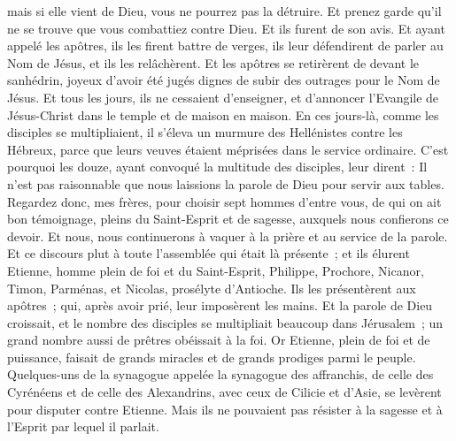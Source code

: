 \begin{multicols}{2}
mais si elle vient de Dieu, vous ne pourrez pas la détruire. Et prenez garde qu'il ne se trouve que vous combattiez contre Dieu.
Et ils furent de son avis. Et ayant appelé les apôtres, ils les firent battre de verges, ils leur défendirent de parler au Nom de Jésus, et ils les relâchèrent.
Et les apôtres se retirèrent de devant le sanhédrin, joyeux d'avoir été jugés dignes de subir des outrages pour le Nom de Jésus.
Et tous les jours, ils ne cessaient d'enseigner, et d'annoncer l'Evangile de Jésus-Christ dans le temple et de maison en maison.
\VerseOne{}En ces jours-là, comme les disciples se multipliaient, il s'éleva un murmure des Hellénistes contre les Hébreux, parce que leurs veuves étaient méprisées dans le service ordinaire.
C'est pourquoi les douze, ayant convoqué la multitude des disciples, leur dirent~: Il n'est pas raisonnable que nous laissions la parole de Dieu pour servir aux tables.
Regardez donc, mes frères, pour choisir sept hommes d'entre vous, de qui on ait bon témoignage, pleins du Saint-Esprit et de sagesse, auxquels nous confierons ce devoir.
Et nous, nous continuerons à vaquer à la prière et au service de la parole.
Et ce discours plut à toute l'assemblée qui était là présente~; et ils élurent Etienne, homme plein de foi et du Saint-Esprit, Philippe, Prochore, Nicanor, Timon, Parménas, et Nicolas, prosélyte d'Antioche.
Ils les présentèrent aux apôtres~; qui, après avoir prié, leur imposèrent les mains.
Et la parole de Dieu croissait, et le nombre des disciples se multipliait beaucoup dans Jérusalem~; un grand nombre aussi de prêtres obéissait à la foi.
Or Etienne, plein de foi et de puissance, faisait de grands miracles et de grands prodiges parmi le peuple.
Quelques-uns de la synagogue appelée la synagogue des affranchis, de celle des Cyrénéens et de celle des Alexandrins, avec ceux de Cilicie et d'Asie, se levèrent pour disputer contre Etienne.
Mais ils ne pouvaient pas résister à la sagesse et à l'Esprit par lequel il parlait.

\end{multicols}
